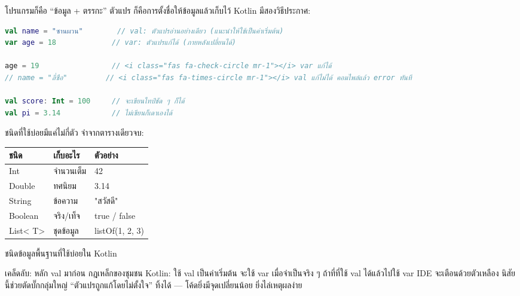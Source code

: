 


โปรแกรมก็คือ “ข้อมูล + ตรรกะ” ตัวแปร ก็คือการตั้งชื่อให้ข้อมูลแล้วเก็บไว้ Kotlin มีสองวิธีประกาศ:

\begin{lstlisting}[language=Kotlin]
val name = "ซานผวน"        // val: ตัวแปรอ่านอย่างเดียว (แนะนำให้ใช้เป็นค่าเริ่มต้น)
var age = 18             // var: ตัวแปรแก้ได้ (ภายหลังเปลี่ยนได้)

age = 19                 // <i class="fas fa-check-circle mr-1"></i> var แก้ได้
// name = "ลี่ซือ"         // <i class="fas fa-times-circle mr-1"></i> val แก้ไม่ได้ คอมไพล์แล้ว error ทันที

val score: Int = 100     // จะเขียนไทป์ชัด ๆ ก็ได้
val pi = 3.14            // ไม่เขียนก็เดาเองได้
\end{lstlisting}

ชนิดที่ใช้บ่อยมีแค่ไม่กี่ตัว จำจากตารางเดียวจบ:

\begin{center}
\begin{tabularx}{\linewidth}{|X|X|X|}
\hline
\textbf{ชนิด} & \textbf{เก็บอะไร} & \textbf{ตัวอย่าง} \tabularnewline
\hline
Int & จำนวนเต็ม & 42 \tabularnewline
Double & ทศนิยม & 3.14 \tabularnewline
String & ข้อความ & "สวัสดี" \tabularnewline
Boolean & จริง/เท็จ & true / false \tabularnewline
List< T> & ชุดข้อมูล & listOf(1, 2, 3) \tabularnewline
\hline
\end{tabularx}
\end{center}

\begin{center}\small\color{gray}ชนิดข้อมูลพื้นฐานที่ใช้บ่อยใน Kotlin\end{center}

\begin{tcbinfo}{เคล็ดลับ: หลัก val มาก่อน}
กฎเหล็กของชุมชน Kotlin: ใช้ val เป็นค่าเริ่มต้น จะใช้ var เมื่อจำเป็นจริง ๆ ถ้าที่ที่ใช้ val ได้แล้วไปใช้ var IDE จะเตือนด้วยตัวเหลือง นิสัยนี้ช่วยตัดบั๊กกลุ่มใหญ่ “ตัวแปรถูกแก้โดยไม่ตั้งใจ” ทิ้งได้ — โค้ดยิ่งมีจุดเปลี่ยนน้อย ยิ่งไล่เหตุผลง่าย

\end{tcbinfo}

